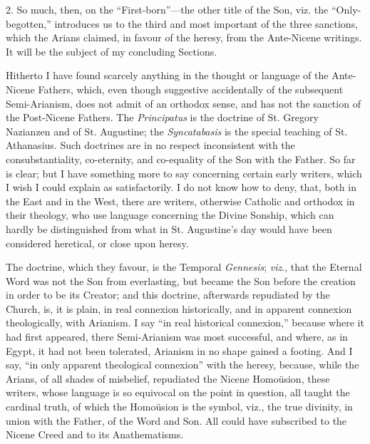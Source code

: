 2. So much, then, on the ``First-born''—the other title
of the Son, viz. the ``Only-begotten,'' introduces us to the
third and most important of the three sanctions, which the Arians
claimed, in favour of the heresy, from the Ante-Nicene writings. It
will be the subject of my concluding Sections.


Hitherto I have found scarcely anything in the thought or language of
the Ante-Nicene Fathers, which, even though suggestive accidentally of
the subsequent Semi-Arianism, does not admit of an orthodox sense, and
has not the sanction of the Post-Nicene Fathers. The \emph{Principatus}
is the doctrine of St. Gregory Nazianzen and of St. Augustine; the \emph{Syncatabasis}
is the special teaching of St. Athanasius. Such doctrines are in no
respect inconsistent with the consubstantiality, co-eternity, and
co-equality of the Son with the Father. So far is clear; but I have
something more to say concerning certain early writers, which I wish I
could explain as satisfactorily. I do not know how to deny, that, both
in the East and in the West, there are writers, otherwise Catholic and
orthodox in their theology, who use language concerning the Divine
Sonship, which can hardly be distinguished from what in St. Augustine's
day would have been considered heretical, or close upon heresy.

The doctrine, which they favour, is the Temporal \emph{Gennesis}; \emph{viz}.,
that the Eternal Word was not the Son from everlasting, but became the
Son before the creation in order to be its Creator; and this doctrine,
afterwards repudiated by the Church, is, it is plain, in real
connexion historically, and in apparent connexion theologically, with
Arianism. I say ``in real historical connexion,'' because where it had first appeared, there Semi-Arianism was most
successful, and where, as in Egypt, it had not been tolerated,
Arianism in no shape gained a footing. And I say, ``in only
apparent theological connexion'' with the heresy, because, while
the Arians, of all shades of misbelief, repudiated the Nicene
Homoüsion, these writers, whose language is so equivocal on the point
in question, all taught the cardinal truth, of which the Homoüsion is
the symbol, viz., the true divinity, in union with the Father, of the
Word and Son. All could have subscribed to the Nicene Creed and to its
Anathematisms.

